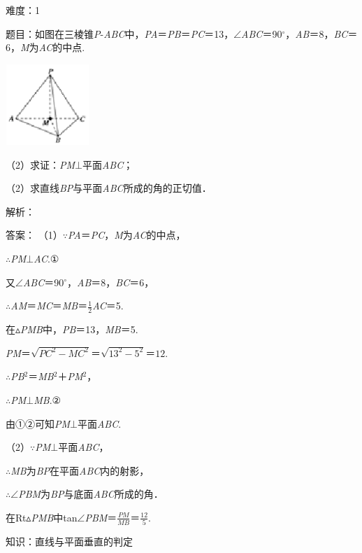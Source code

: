 \documentclass{article} %
\begin{document}
难度：1

题目：如图在三棱锥\textit{P}-\textit{ABC}中，\textit{PA}＝\textit{PB}＝\textit{PC}＝13，$\mathrm{\angle}$\textit{ABC}＝90$\mathrm{{}^\circ}$，\textit{AB}＝8，\textit{BC}＝6，\textit{M}为\textit{AC}的中点.

\includegraphics*[width=1.25in, height=1.20in, keepaspectratio=false]{image199}

（2）求证：\textit{PM}$\mathrm{\bot}$平面\textit{ABC}；

（2）求直线\textit{BP}与平面\textit{ABC}所成的角的正切值．

解析：

答案：
（1）$\mathrm{\because}$\textit{PA}＝\textit{PC}，\textit{M}为\textit{AC}的中点，

$\mathrm{\therefore}$\textit{PM}$\mathrm{\bot}$\textit{AC}.①

又$\mathrm{\angle}$\textit{ABC}＝90$\mathrm{{}^\circ}$，\textit{AB}＝8，\textit{BC}＝6，

$\mathrm{\therefore}$\textit{AM}＝\textit{MC}＝\textit{MB}＝$\frac{1}{2}$\textit{AC}＝5.

在$\mathrm{\vartriangle}$\textit{PMB}中，\textit{PB}＝13，\textit{MB}＝5.

\textit{PM}＝$\sqrt{PC^2-MC^2}＝\sqrt{13^2-5^2}＝12$.

$\mathrm{\therefore}$\textit{PB}${}^{2}$＝\textit{MB}${}^{2}$＋\textit{PM}${}^{2}$，

$\mathrm{\therefore}$\textit{PM}$\mathrm{\bot}$\textit{MB}.②

由①②可知\textit{PM}$\mathrm{\bot}$平面\textit{ABC}.

（2）$\mathrm{\because}$\textit{PM}$\mathrm{\bot}$平面\textit{ABC}，

$\mathrm{\therefore}$\textit{MB}为\textit{BP}在平面\textit{ABC}内的射影，

$\mathrm{\therefore}$$\mathrm{\angle}$\textit{PBM}为\textit{BP}与底面\textit{ABC}所成的角．

在Rt$\mathrm{\vartriangle}$\textit{PMB}中tan$\mathrm{\angle}$\textit{PBM}＝$\frac{PM}{MB}$＝$\frac{12}{5}$.

知识：直线与平面垂直的判定
\end{document}
